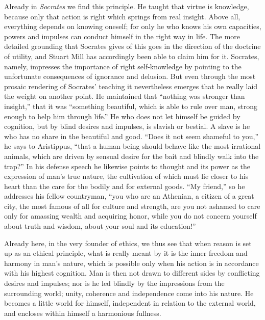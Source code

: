 \documentclass[12pt,a4paper,openany]{book}
\newcommand{\opage}[1]{\marginnote{\footnotesize\textit{[#1]}}}
\begin{document}
Already in \emph{Socrates} we find this principle. He taught that virtue is
knowledge, because only that action is right which springs from real insight.
Above \opage{46}all, everything depends on knowing oneself; for only he who
knows his own capacities, powers and impulses can conduct himself in the right
way in life. The more detailed grounding that Socrates gives of this goes in
the direction of the doctrine of utility, and Stuart Mill has accordingly been
able to claim him for it. Socrates, namely, impresses the importance of right
self-knowledge by pointing to the unfortunate consequences of ignorance and
delusion. But even through the most prosaic rendering of Socrates' teaching it
nevertheless emerges that he really laid the weight on another point. He
maintained that ``nothing was stronger than insight,'' that it was ``something
beautiful, which is able to rule over man, strong enough to help him through
life.'' He who does not let himself be guided by cognition, but by blind
desires and impulses, is slavish or bestial. A slave is he who has no share in
the beautiful and good. ``Does it not seem shameful to you,'' he says to
Aristippus, ``that a human being should behave like the most irrational
animals, which are driven by sensual desire for the bait and blindly walk into
the trap?'' In his defense speech he likewise points to thought and its power
as the expression of man's true nature, the cultivation of which must lie
closer to his heart than the care for the bodily and for external goods. ``My
friend,'' so he addresses his fellow countryman, ``you who are an Athenian, a
citizen of a great city, the most famous of all for culture and strength, are
you not ashamed to care only for amassing wealth and acquiring honor, while
you do not concern \opage{47}yourself about truth and wisdom, about your soul
and its education!''

Already here, in the very founder of ethics, we thus see that when reason is
set up as an ethical principle, what is really meant by it is the inner
freedom and harmony in man's nature, which is possible only when his action is
in accordance with his highest cognition. Man is then not drawn to different
sides by conflicting desires and impulses; nor is he led blindly by the
impressions from the surrounding world; unity, coherence and independence come
into his nature. He becomes a little world for himself, independent in
relation to the external world, and encloses within himself a harmonious
fullness.
\end{document}
